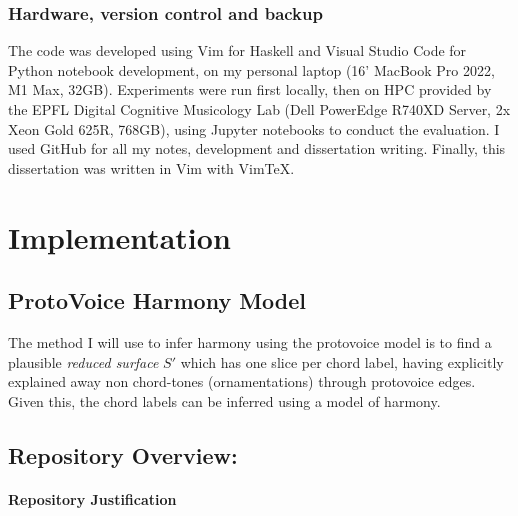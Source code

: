 \documentclass[12pt,a4paper,twoside,openright]{report}
\theoremstyle{definition}
\begin{document}
\subsection{Hardware, version control and backup}
The code was developed using Vim for Haskell and Visual Studio Code for Python notebook development, on my personal laptop (16' MacBook Pro 2022, M1 Max, 32GB). 
Experiments were run first locally, then on HPC provided by the EPFL Digital Cognitive Musicology Lab (Dell PowerEdge R740XD Server, 2x Xeon Gold 625R, 768GB), using Jupyter notebooks to conduct the evaluation. I used GitHub for all my notes, development and dissertation writing. Finally, this dissertation was written in Vim with VimTeX.


\chapter{Implementation}

\section{ProtoVoice Harmony Model}

The method I will use to infer harmony using the protovoice model is to find a plausible \textit{reduced surface} $S'$ which has one slice per chord label, having explicitly explained away non chord-tones (ornamentations) through protovoice edges. 
Given this, the chord labels can be inferred using a model of harmony.

\section{Repository Overview:}

\subsubsection{Repository Justification}
\end{document}
